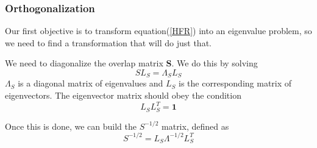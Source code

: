\documentclass[a4paper]{article}
\begin{document}
\subsubsection{Orthogonalization}
Our first objective is to transform equation(\ref{HFR}) into an eigenvalue problem, so we need to find a transformation that will do just that.

We need to diagonalize the overlap matrix \textbf{S}. 
We do this by solving
$$
S L_S = \Lambda_S L_S
$$
$\Lambda_S$ is a diagonal matrix of eigenvalues and $L_S$ is the corresponding matrix of eigenvectors.
The eigenvector matrix should obey the condition
$$
L_S L^{T}_{S} = \boldsymbol 1
$$

Once this is done, we can build the $ S^{-1/2}$ matrix, defined as 
$$
S^{-1/2} = L_S \Lambda^{-1/2} L^{T}_{S}
$$
\end{document}
